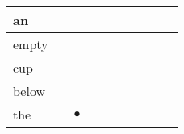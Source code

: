 \documentclass[landscape]{article}
\newcommand{\ssp}{\hspace{2pt}}
\newcommand{\mex}{\cellcolor{g}$\bullet$}
\begin{document}
\begin{tabular}{|l|p{10pt}|p{10pt}|p{10pt}|p{10pt}|p{10pt}|p{10pt}|p{10pt}|p{10pt}|p{10pt}|}
\hline
\ssp an \ssp&\hspace{2pt}&\hspace{2pt}&\hspace{2pt}&\hspace{2pt}&\hspace{2pt}&\hspace{2pt}&\hspace{2pt}&\hspace{2pt}&\hspace{2pt}\\
\hline
\ssp empty \ssp&\hspace{2pt}&\hspace{2pt}&\hspace{2pt}&\hspace{2pt}&\hspace{2pt}&\hspace{2pt}&\hspace{2pt}&\hspace{2pt}&\hspace{2pt}\\
\hline
\ssp cup \ssp&\hspace{2pt}&\hspace{2pt}&\hspace{2pt}&\hspace{2pt}&\hspace{2pt}&\hspace{2pt}&\hspace{2pt}&\hspace{2pt}&\hspace{2pt}\\
\hline
\ssp below \ssp&\hspace{2pt}&\hspace{2pt}&\hspace{2pt}&\hspace{2pt}&\hspace{2pt}&\hspace{2pt}&\hspace{2pt}&\hspace{2pt}&\hspace{2pt}\\
\hline
\ssp \cellcolor{ref1}the \ssp&\hspace{2pt}&\hspace{2pt}\mex&\hspace{2pt}&\hspace{2pt}&\hspace{2pt}&\hspace{2pt}&\hspace{2pt}&\hspace{2pt}&\hspace{2pt}\\

\end{tabular}
\end{document}
